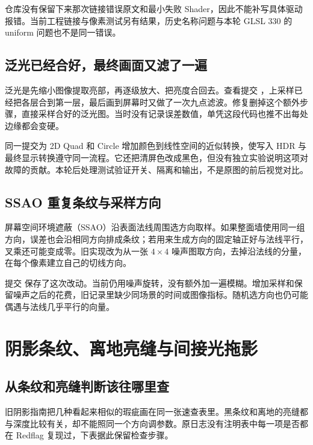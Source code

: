 仓库没有保留下来那次链接错误原文和最小失败 Shader，因此不能补写具体驱动报错。当前工程链接与像素测试另有结果，历史名称问题与本轮 GLSL 330 的 uniform 问题也不是同一错误。

\subsection{泛光已经合好，最终画面又滤了一遍}
泛光是先缩小图像提取亮部，再逐级放大、把亮度合回去。查看提交 ，上采样已经把各层合到第一层，最后画到屏幕时又做了一次九点滤波。修复删掉这个额外步骤，直接采样合好的泛光图。当时没有记录误差数值，单凭这段代码也推不出每处边缘都会变硬。

同一提交为 2D Quad 和 Circle 增加颜色到线性空间的近似转换，使写入 HDR 与最终显示转换遵守同一流程。它还把清屏色改成黑色，但没有独立实验说明这项对故障的贡献。本轮后处理测试验证开关、隔离和输出，不是原图的前后视觉对比。

\subsection{SSAO 重复条纹与采样方向}
屏幕空间环境遮蔽（SSAO）沿表面法线周围选方向取样。如果整面墙使用同一组方向，误差也会沿相同方向排成条纹；若用来生成方向的固定轴正好与法线平行，叉乘还可能变成零。旧实现改为从一张 $4\times4$ 噪声图取方向，去掉沿法线的分量，在每个像素建立自己的切线方向。

提交 \rev{82989dd} 保存了这次改动。当前仍用噪声旋转，没有额外加一遍模糊。增加采样和保留噪声之后的花费，旧记录里缺少同场景的时间或图像指标。随机选方向也仍可能偶遇与法线几乎平行的向量。

\newpage
\section{阴影条纹、离地亮缝与间接光拖影}
\subsection{从条纹和亮缝判断该往哪里查}
旧阴影指南把几种看起来相似的瑕疵画在同一张速查表里。黑条纹和离地的亮缝都与深度比较有关，却不能照同一个方向调参数。原日志没有注明表中每一项是否都在 Redflag 复现过，下表据此保留检查步骤。

